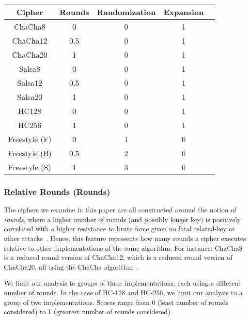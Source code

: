 \begin{table}[ht]
   \begin{tabular}{@{}ccccc@{}}
   \toprule
   \textbf{Cipher} & \textbf{Rounds} & \textbf{Randomization} &
   \textbf{Expansion} \\
   \midrule
   ChaCha8         & 0           & 0           & 1           \\
   ChaCha12        & 0.5         & 0           & 1           \\
   ChaCha20        & 1           & 0           & 1           \\
   Salsa8          & 0           & 0           & 1           \\
   Salsa12         & 0.5         & 0           & 1           \\
   Salsa20         & 1           & 0           & 1           \\
   HC128           & 0           & 0           & 1           \\
   HC256           & 1           & 0           & 1           \\
   Freestyle (F)   & 0           & 1           & 0           \\
   Freestyle (B)   & 0.5         & 2           & 0           \\
   Freestyle (S)   & 1           & 3           & 0           \\
\end{tabular}
   \caption{}
   \label{tbl:security-quant}
 \end{table}

\subsubsection{Relative Rounds (Rounds)}

The ciphers we examine in this paper are all constructed around the notion of
\emph{rounds}, where a higher number of rounds (and possibly longer key) is
positively correlated with a higher resistance to brute force given no fatal
related-key or other attacks~\cite{ChaCha-Cryptanalysis}. Hence, this feature
represents how many rounds a cipher executes relative to other implementations
of the same algorithm. For instance: ChaCha8 is a reduced round version of
ChaCha12, which is a reduced round version of ChaCha20, all using the ChaCha
algorithm~\cite{ChaCha20,ChaCha-Cryptanalysis}.

We limit our analysis to groups of three implementations, each using a different
number of rounds. In the case of HC-128 and HC-256, we limit our analysis to a
group of two implementations. Scores range from 0 (least number of rounds
considered) to 1 (greatest number of rounds considered).

